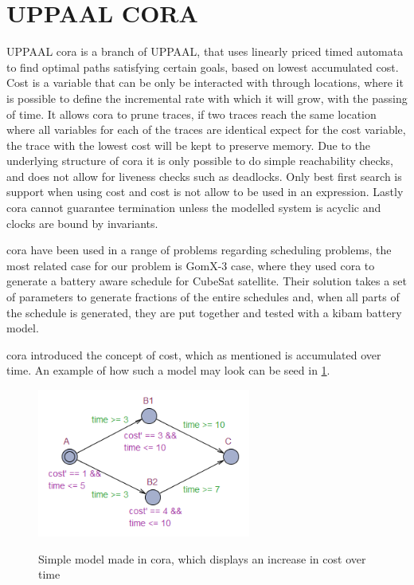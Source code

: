 \section{UPPAAL CORA}\label{sec:upp_cora}
UPPAAL \acrfull{cora} is a branch of UPPAAL, that uses linearly priced timed automata to find optimal paths satisfying certain goals, based on lowest accumulated cost\cite{cs_cora}. Cost is a variable that can be only be interacted with through locations, where it is possible to define the incremental rate with which it will grow, with the passing of time. It allows \gls{cora} to prune traces, if two traces reach the same location where all variables for each of the traces are identical expect for the cost variable, the trace with the lowest cost will be kept to preserve memory. Due to the underlying structure of \gls{cora} it is only possible to do simple reachability checks, and does not allow for liveness checks such as deadlocks. Only best first search is support when using cost and cost is not allow to be used in an expression. Lastly \gls{cora} cannot guarantee termination unless the modelled system is acyclic and clocks are bound by invariants.

\Gls{cora} have been used in a range of problems regarding scheduling problems, the most related case for our problem is GomX-3 case, where they used \gls{cora} to generate a battery aware schedule for CubeSat satellite. Their solution takes a set of parameters to generate fractions of the entire schedules and, when all parts of the schedule is generated, they are put together and tested with a \gls{kibam} battery model. 

\Gls{cora} introduced the concept of cost, which as mentioned is accumulated over time. An example of how such a model may look can be seed in \cref{fig:cora_eks}.

\begin{figure}[h]
\begin{centering}
	\includegraphics[width=7cm]{graphics/cora_eks.png}
	\label{fig:cora_eks}
	\caption{Simple model made in \gls{cora}, which displays an increase in cost over time}
\end{centering}
\end{figure}

